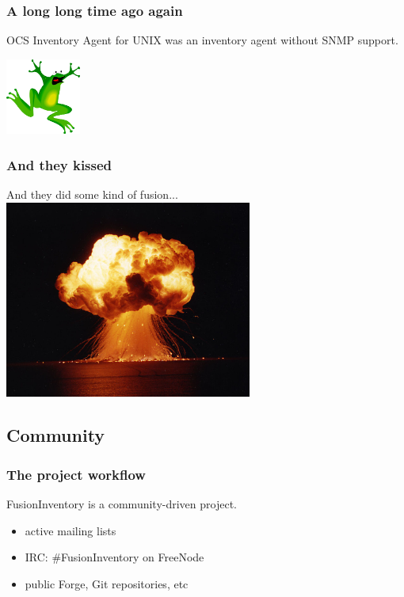 \documentclass{beamer}
\begin{document}
\begin{frame}
    \frametitle{A long long time ago again}
    
    OCS Inventory Agent for UNIX was an inventory agent without SNMP support.

    \includegraphics[height=2.5cm]{./pics/frog2.pdf}
\end{frame}

\begin{frame}
    \frametitle{And they kissed}
    
    And they did some kind of fusion...
    \includegraphics[height=6.5cm]{./pics/explode.jpg}
\end{frame}


\subsection{Community}

\begin{frame}
    \frametitle{The project workflow}
    FusionInventory is a community-driven project.

    \begin{itemize}
        \item active mailing lists
        \item IRC: \#FusionInventory on FreeNode
        \item public Forge, Git repositories, etc
    \end{itemize}
\end{frame}
\end{document}
